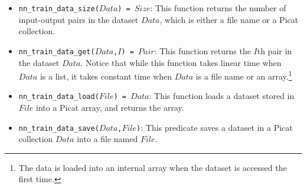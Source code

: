\begin{itemize}
\item \texttt{nn\_train\_data\_size($Data$) = $Size$}: This function returns the number of input-output pairs in the dataset $Data$, which is either a file name or a Picat collection.

\item \texttt{nn\_train\_data\_get($Data$,$I$) = $Pair$}: This function returns the $I$th pair in the dataset $Data$. Notice that while this function takes linear time when $Data$ is a list, it takes constant time when $Data$ is a file name or an array.\footnote{The data is loaded into an internal array when the dataset is accessed the first time.}

\item \texttt{nn\_train\_data\_load($File$) = $Data$}: This function loads a dataset stored in $File$ into a Picat array, and returns the array.

\item \texttt{nn\_train\_data\_save($Data$,$File$)}: This predicate saves a dataset in a Picat collection $Data$ into a file named $File$.
\end{itemize}


